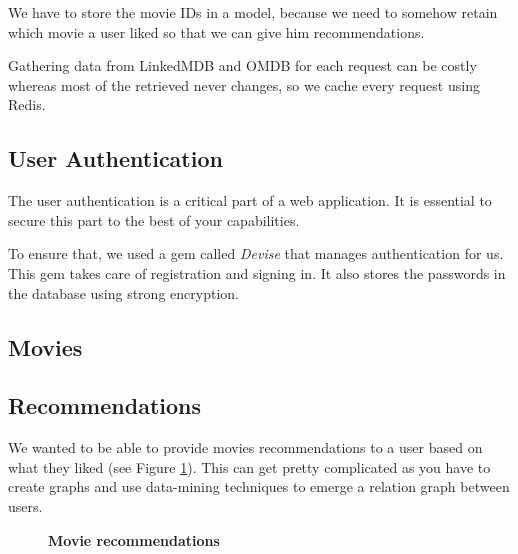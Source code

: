 \documentclass[12pt,a4paper]{article}
\begin{document}
We have to store the movie IDs in a model, because we need to somehow retain which movie a user liked so that we can give him recommendations.

Gathering data from LinkedMDB and OMDB for each request can be costly whereas most of the retrieved never changes, so we cache every request using Redis.

\subsection{User Authentication}
The user authentication is a critical part of a web application. It is essential to secure this part to the best of your capabilities.

To ensure that, we used a gem called \textit{Devise} that manages authentication for us. This gem takes care of registration and signing in. It also stores the passwords in the database using strong encryption.

\subsection{Movies}
\subsection{Recommendations}
We wanted to be able to provide movies recommendations to a user based on what they liked (see Figure \ref{recommendation}). This can get pretty complicated as you have to create graphs and use data-mining techniques to emerge a relation graph between users.

\begin{figure}[h]
\begin{center}
\end{center}
\caption{\textbf{Movie recommendations}}
\label{recommendation}
\end{figure}
\end{document}
